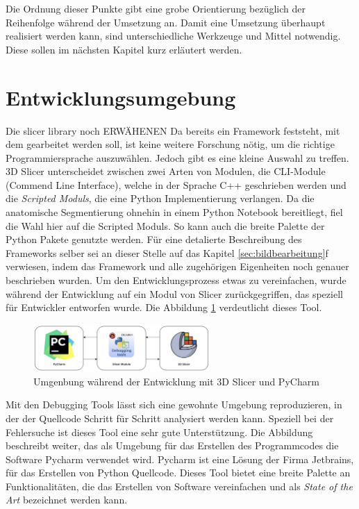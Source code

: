 Die Ordnung dieser Punkte gibt eine grobe Orientierung bezüglich der Reihenfolge
während der Umsetzung an. Damit eine Umsetzung überhaupt realisiert werden kann,
sind unterschiedliche Werkzeuge und Mittel notwendig. Diese sollen im nächsten Kapitel
kurz erläutert werden.

\section{Entwicklungsumgebung}
Die slicer library noch ERWÄHENEN Da bereits ein Framework feststeht, mit dem
gearbeitet werden soll, ist keine weitere Forschung nötig, um die richtige
Programmiersprache auszuwählen. Jedoch gibt es eine kleine Auswahl zu treffen.
3D Slicer unterscheidet zwischen zwei Arten von Modulen, die CLI-Module (Commend
Line Interface), welche in der Sprache C++ geschrieben werden und die \textit{Scripted
Moduls}, die eine Python Implementierung verlangen. Da die anatomische Segmentierung
ohnehin in einem Python Notebook bereitliegt, fiel die Wahl hier auf die
Scripted Moduls. So kann auch die breite Palette der Python Pakete genutzte werden.
Für eine detalierte Beschreibung des Frameworks selber sei an dieser Stelle auf
das Kapitel \ref{sec:bildbearbeitung}f verwiesen, indem das Framework und alle
zugehörigen Eigenheiten noch genauer beschrieben wurden. Um den Entwicklungsprozess
etwas zu vereinfachen, wurde während der Entwicklung auf ein Modul von Slicer
zurückgegriffen, das speziell für Entwickler entworfen wurde. Die Abbildung
\ref{fig:entwicklungsumgebung} verdeutlicht dieses Tool.

\begin{figure}[h]
	\centering
	\includegraphics[width=0.6\textwidth]{img/Entwicklungsumgebung.png}
	\caption{Umgenbung während der Entwicklung mit 3D Slicer und PyCharm}
	\label{fig:entwicklungsumgebung}
\end{figure}

Mit den Debugging Tools lässt sich eine gewohnte Umgebung reproduzieren, in der
der Quellcode Schritt für Schritt analysiert werden kann. Speziell bei der Fehlersuche
ist dieses Tool eine sehr gute Unterstützung. Die Abbildung beschreibt weiter, das
als Umgebung für das Erstellen des Programmcodes die Software Pycharm verwendet wird.
Pycharm ist eine Lösung der Firma Jetbrains, für das Erstellen von Python Quellcode.
Dieses Tool bietet eine breite Palette an Funktionalitäten, die das Erstellen von
Software vereinfachen und als \textit{State of the Art} bezeichnet werden kann.

